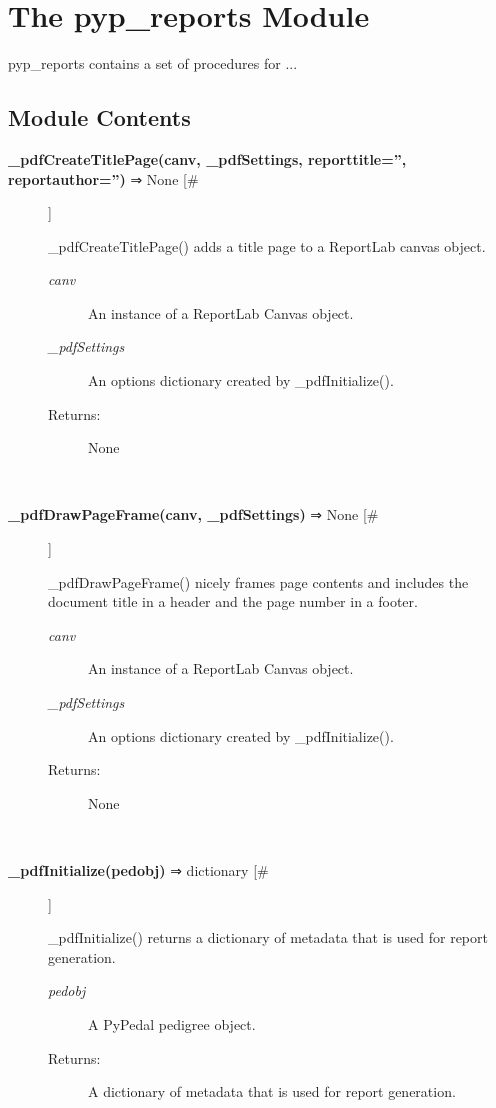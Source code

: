 \documentclass{article}
\begin{document}
\section*{The pyp\_reports Module}
\par pyp\_reports contains a set of procedures for ...
\subsection*{Module Contents}
\begin{description}
\item[\textbf{\_pdfCreateTitlePage(canv, \_pdfSettings, reporttitle='', reportauthor='')} ⇒ None [\#]
]
\par \_pdfCreateTitlePage() adds a title page to a ReportLab canvas object.
\begin{description}
\item[\textit{canv}
]
An instance of a ReportLab Canvas object.
\item[\textit{\_pdfSettings}
]
An options dictionary created by \_pdfInitialize().
\item[Returns:
]
None
\end{description}\\

\item[\textbf{\_pdfDrawPageFrame(canv, \_pdfSettings)} ⇒ None [\#]
]
\par \_pdfDrawPageFrame() nicely frames page contents and includes the
document title in a header and the page number in a footer.
\begin{description}
\item[\textit{canv}
]
An instance of a ReportLab Canvas object.
\item[\textit{\_pdfSettings}
]
An options dictionary created by \_pdfInitialize().
\item[Returns:
]
None
\end{description}\\

\item[\textbf{\_pdfInitialize(pedobj)} ⇒ dictionary [\#]
]
\par \_pdfInitialize() returns a dictionary of metadata that is used for report
generation.
\begin{description}
\item[\textit{pedobj}
]
A PyPedal pedigree object.
\item[Returns:
]
A dictionary of metadata that is used for report generation.
\end{description}\\


\end{description}
\end{document}
